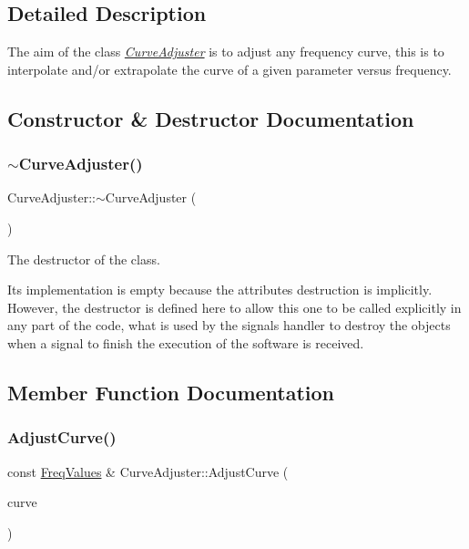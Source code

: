 \subsection{Detailed Description}
The aim of the class {\itshape \hyperlink{classCurveAdjuster}{Curve\+Adjuster}} is to adjust any frequency curve, this is to interpolate and/or extrapolate the curve of a given parameter versus frequency. 

\subsection{Constructor \& Destructor Documentation}
\mbox{\label{classCurveAdjuster_ae1939fed50d532e46bef47db5e3883c3}} 
\subsubsection{\texorpdfstring{$\sim$\+Curve\+Adjuster()}{~CurveAdjuster()}}
{\footnotesize\ttfamily Curve\+Adjuster\+::$\sim$\+Curve\+Adjuster (\begin{DoxyParamCaption}{ }\end{DoxyParamCaption})\hspace{0.3cm}{\ttfamily [inline]}}



The destructor of the class. 

Its implementation is empty because the attributes destruction is implicitly. However, the destructor is defined here to allow this one to be called explicitly in any part of the code, what is used by the signals handler to destroy the objects when a signal to finish the execution of the software is received. 

\subsection{Member Function Documentation}
\mbox{\label{classCurveAdjuster_a3645614620645c7bfd86386576072d0a}} 
\subsubsection{\texorpdfstring{Adjust\+Curve()}{AdjustCurve()}}
{\footnotesize\ttfamily const \hyperlink{structFreqValues}{Freq\+Values} \& Curve\+Adjuster\+::\+Adjust\+Curve (\begin{DoxyParamCaption}\item[{const \hyperlink{structFreqValues}{Freq\+Values} \&}]{curve }\end{DoxyParamCaption})}



